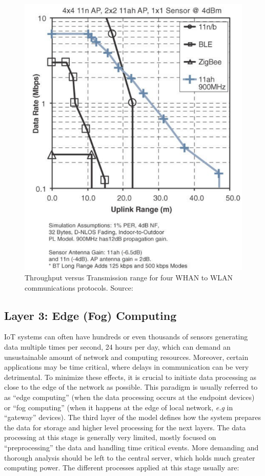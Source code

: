 \begin{figure}[H]
    \centering
    \includegraphics[width=0.55\linewidth]{images/communication-protocols-throughput.png}
    \caption{Throughput versus Transmission range for four WHAN to WLAN communications protocols. Source: \cite{10.5555/3161403}}
    \label{fig:communication-protocols-throughput}
\end{figure}

\subsection{Layer 3: Edge (Fog) Computing}
\label{sec:iot-model-layer3}

\acs{IoT} systems can often have hundreds or even thousands of sensors generating data multiple times per second, 24 hours per day, which can demand an unsustainable amount of network and computing resources. Moreover, certain applications may be time critical, where delays in communication can be very detrimental. To minimize these effects, it is crucial to initiate data processing as close to the edge of the network as possible. This paradigm is usually referred to as ``edge computing'' (when the data processing occurs at the endpoint devices) or ``fog computing'' (when it happens at the edge of local network, \textit{e.g} in ``gateway'' devices). The third layer of the model defines how the system prepares the data for storage and higher level processing for the next layers. The data processing at this stage is generally very limited, mostly focused on ``preprocessing'' the data and handling time critical events. More demanding and thorough analysis should be left to the central server, which holds much greater computing power. The different processes applied at this stage usually are:

